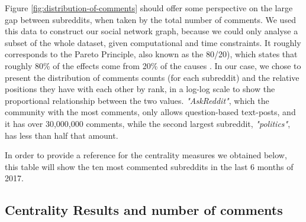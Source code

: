 \documentclass[bsc,frontabs,twoside,singlespacing,parskip,deptreport]{infthesis}
\begin{document}
Figure \ref{fig:distribution-of-comments} should offer some perspective on the large gap between subreddits, when taken by the total number of comments. We used this data to construct our social network graph, because we could only analyse a subset of the whole dataset, given computational and time constraints. It roughly corresponds to the Pareto Principle, also known as the 80/20), which states that roughly 80\% of the effects come from 20\% of the causes \cite{pareto}. In our case, we chose to present the distribution of comments counts (for each subreddit) and the relative positions they have with each other by rank, in a log-log scale to show the proportional relationship between the two values. \textit{"AskReddit"}, which the community with the most comments, only allows question-based text-posts, and it has over 30,000,000 comments, while the second largest subreddit, \textit{"politics"}, has less than half that amount.

In order to provide a reference for the centrality measures we obtained below, this table will show the ten most commented subreddits in the last 6 months of 2017. 

\vfill

\begin{table}[!h]
\centering
{}
\caption{Top 10 subreddits with the highest number of comments between July and December 2017 (inclusive)}
\label{top-commented}
\end{table}


\newpage

\subsection{Centrality Results and number of comments}
\end{document}
